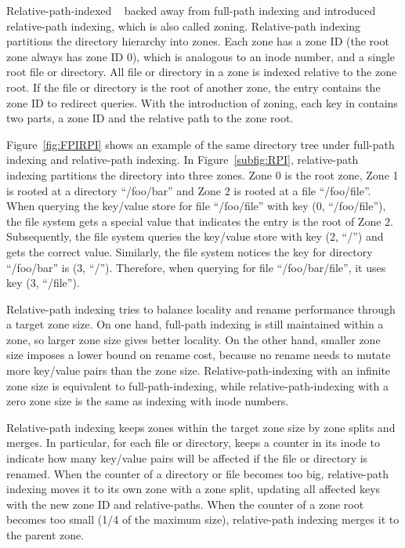 Relative-path-indexed \betrfs~\citep{betrfs2,betrfs2tos} backed away from
full-path indexing and introduced relative-path indexing,
which is also called zoning.
Relative-path indexing partitions the directory hierarchy into zones.
Each zone has a zone ID (the root zone always has zone ID 0), which is analogous
to an inode number, and a single root file or directory.
All file or directory in a zone is indexed relative to the zone root.
If the file or directory is the root of another zone, the entry contains the
zone ID to redirect queries.
With the introduction of zoning, each key in \betrfs contains two parts,
a zone ID and the relative path to the zone root.

Figure~\ref{fig:FPIRPI} shows an example of the same directory tree under
full-path indexing and relative-path indexing.
In Figure~\ref{subfig:RPI}, relative-path indexing partitions the directory
into three zones.
Zone 0 is the root zone, Zone 1 is rooted at a directory ``/foo/bar'' and
Zone 2 is rooted at a file ``/foo/file''.
When querying the key/value store for file ``/foo/file'' with key
(0, ``/foo/file''), the file system gets a special value that
indicates the entry is the root of Zone 2.
Subsequently, the file system queries the key/value store with key (2, ``/'')
and gets the correct value.
Similarly, the file system notices the key for directory ``/foo/bar'' is
(3, ``/'').
Therefore, when querying for file ``/foo/bar/file'', it uses key (3, ``/file'').

\newcommand{\addTokubenchZonePlot}[1]
{
    \addplot[
        color=\pgfkeysvalueof{/fs-colors/#1},
        line width=0.75pt,
        mark=\pgfkeysvalueof{/fs-marks/#1},
    ]
    plot[
    ]
    table[
    ]
    {./data/tokuzone/#1.csv};
    \addlegendentry{\pgfkeysvalueof{/fs-names/#1}}
}

Relative-path indexing tries to balance locality and rename performance through
a target zone size.
On one hand, full-path indexing is still maintained within a zone,
so larger zone size gives better locality.
On the other hand, smaller zone size imposes a lower bound on rename cost,
because no rename needs to mutate more key/value pairs than the zone size.
Relative-path-indexing with an infinite zone size is equivalent to
full-path-indexing, while relative-path-indexing with a zero zone size is the
same as indexing with inode numbers.

Relative-path indexing keeps zones within the target zone size by zone splits
and merges.
In particular, for each file or directory, \betrfs keeps a counter in its inode
to indicate how many key/value pairs will be affected if the file or directory
is renamed.
When the counter of a directory or file becomes too big,
relative-path indexing moves it to its own zone with a zone split,
updating all affected keys with the new zone ID and relative-paths.
When the counter of a zone root becomes too small (1/4 of the maximum
size), relative-path indexing merges it to the parent zone.

